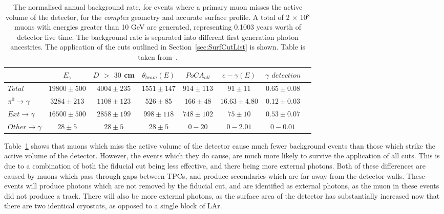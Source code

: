 \begin{table}
  \caption[The normalised annual background rate, for events where a primary muon misses the active volume of the detector, for the \emph{complex} geometry and accurate surface profile]
          {The normalised annual background rate, for events where a primary muon misses the active volume of the detector, for the \emph{complex} geometry and accurate surface profile. A total of 2 $\times$ 10$^8$ muons with energies greater than 10 GeV are generated, representing 0.1003 years worth of detector live time. The background rate is separated into different first generation photon ancestries. The application of the cuts outlined in Section~\ref{sec:SurfCutList} is shown. Table is taken from~\citep{MartinsThesis}.}
  \label{tab:SurfMuMissComp}
  \centering
  \scriptsize
  \begin{tabular}{l c c c c c c c }
    \toprule
        & $E_\gamma$ &  $D$ $>$ $30$ cm & $\theta_{beam}(E)$ & $PoCA_{all}$ & $e-\gamma(E)$ & $\gamma$ $detection$ \\
        \midrule
        $Total$          & $19800\pm500$ & $4004\pm235$ & $1551\pm147$ & $914\pm113$ & $91\pm11$      & $0.65\pm0.08$ \\

        $\pi^0\to\gamma$ & $3284\pm213$  & $1108\pm123$ & $526\pm85$   & $166\pm48$  & $16.63\pm4.80$ & $0.12\pm0.03$ \\

        $Ext\to\gamma$   & $16500\pm500$ & $2858\pm199$ & $998\pm118$  & $748\pm102$ & $75\pm10$      & $0.53\pm0.07$ \\

        $Other\to\gamma$ & $28\pm5$      & $28\pm5$     & $28\pm5$     & $0-20$      & $0-2.01$       & $0-0.01$ \\
        \bottomrule
  \end{tabular}
\end{table}

Table~\ref{tab:SurfMuMissComp} shows that muons which miss the active volume of the detector cause much fewer background events than those which strike the active volume of the detector. However, the events which they do cause, are much more likely to survive the application of all cuts. This is due to a combination of both the fiducial cut being less effective, and there being more external photons. Both of these differences are caused by muons which pass through gaps between TPCs, and produce secondaries which are far away from the detector walls. These events will produce photons which are not removed by the fiducial cut, and are identified as external photons, as the muon in these events did not produce a track. There will also be more external photons, as the surface area of the detector has substantially increased now that there are two identical cryostats, as opposed to a single block of LAr. \\

